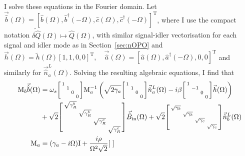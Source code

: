 I solve these equations in the Fourier domain. Let $\vec{\hat b}(\Omega)=[\hat b(\Omega), \hat b^\dag(-\Omega), \hat c(\Omega), \hat c^\dag(-\Omega)]^\text{T}$, where I use the compact notation $\tilde{\delta\hat{Q}}(\Omega)\mapsto\hat{Q}(\Omega)$, with similar signal-idler vectorisation for each signal and idler mode as in Section~\ref{sec:nOPO} and $\vec h(\Omega)=\tilde h(\Omega) [1,1,0,0]^\text{T},\quad \vec{\hat a}(\Omega)=[\hat a(\Omega), \hat a^\dag(-\Omega),0,0]^\text{T}$ and similarly for $\vec{\hat n}^L_a(\Omega)$. Solving the resulting algebraic equations, I find that
\begin{align}
\mathrm{M}_b\vec{\hat{b}}(\Omega)&= \omega_s\begin{bsmallmatrix}
1 &  &  &  \\
 & 1 &  &  \\
 &  & 0 &  \\
 &  &  & 0
\end{bsmallmatrix}\mathrm{M}_a^{-1}\left(\sqrt{2\gamma_a}\begin{bsmallmatrix}
1 &  &  &  \\
 & 1 &  &  \\
 &  & 0 &  \\
 &  &  & 0
\end{bsmallmatrix}\vec{\hat{n}}^L_a(\Omega)-i\beta\begin{bsmallmatrix}
1 &  &  &  \\
 & -1 &  &  \\
 &  & 0 &  \\
 &  &  & 0
\end{bsmallmatrix}\vec{h}(\Omega)\right)\\&+ \sqrt{2}\begin{bsmallmatrix}
\sqrt{\gamma^b_R} &  &  &  \\
 & \sqrt{\gamma^b_R} &  &  \\
 &  & \sqrt{\gamma^c_R} &  \\
 &  &  & \sqrt{\gamma^c_R}
\end{bsmallmatrix}\vec{\hat B}_\mathrm{in}(\Omega) + \sqrt{2}\begin{bsmallmatrix}
\sqrt{\gamma_b} &  &  &  \\
 & \sqrt{\gamma_b} &  &  \\
 &  & \sqrt{\gamma_c} &  \\
 &  &  & \sqrt{\gamma_c}
\end{bsmallmatrix}\vec{\hat n}^L_b(\Omega)\\
\mathrm{M}_a &= (\gamma_a-i\Omega)\mathrm{I}+\frac{i\rho}{\Omega^2 \sqrt{2}}\begin{bsmallmatrix}

\end{bsmallmatrix}
\end{align}
